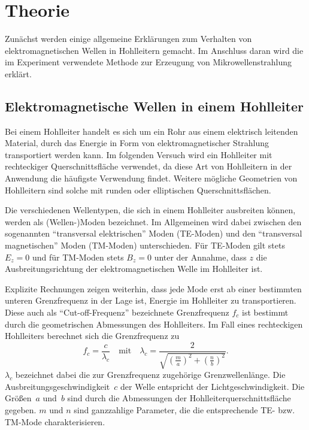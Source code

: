 \section{Theorie}
\label{sec:theorie}

Zunächst werden einige allgemeine Erklärungen zum Verhalten von elektromagnetischen Wellen in Hohlleitern gemacht.
Im Anschluss daran wird die im Experiment verwendete Methode zur Erzeugung von Mikrowellenstrahlung erklärt.

\subsection{Elektromagnetische Wellen in einem Hohlleiter}

Bei einem Hohlleiter handelt es sich um ein Rohr aus einem elektrisch leitenden Material, durch das Energie in Form von elektromagnetischer Strahlung transportiert werden kann.
Im folgenden Versuch wird ein Hohlleiter mit rechteckiger Querschnittsfläche verwendet, da diese Art von Hohlleitern in der Anwendung die häufigste Verwendung findet.
Weitere mögliche Geometrien von Hohlleitern sind solche mit runden oder elliptischen Querschnittsflächen.

Die verschiedenen Wellentypen, die sich in einem Hohlleiter ausbreiten können, werden als (Wellen-)Moden bezeichnet.
Im Allgemeinen wird dabei zwischen den sogenannten \enquote{transversal elektrischen} Moden (TE-Moden) und den \enquote{transversal magnetischen} Moden (TM-Moden) unterschieden.
Für TE-Moden gilt stets $E_z=0$ und für TM-Moden stets $B_z=0$ unter der Annahme, dass $z$ die Ausbreitungsrichtung der elektromagnetischen Welle im Hohlleiter ist.

Explizite Rechnungen zeigen weiterhin, dass jede Mode erst ab einer bestimmten unteren Grenzfrequenz in der Lage ist, Energie im Hohlleiter zu transportieren.
Diese auch als \enquote{Cut-off-Frequenz} bezeichnete Grenzfrequenz $f_c$ ist bestimmt durch die geometrischen Abmessungen des Hohlleiters.
Im Fall eines rechteckigen Hohlleiters berechnet sich die Grenzfrequenz zu
%
\begin{equation}
	f_c=\frac{c}{\lambda_c}\quad\text{mit}\quad\lambda_c=\frac{2}{\sqrt{\left(\frac{m}{a}\right)^2+\left(\frac{n}{b}\right)^2}}.
	\label{eq:cutoff}
\end{equation}
%
$\lambda_c$ bezeichnet dabei die zur Grenzfrequenz zugehörige Grenzwellenlänge.
Die Ausbreitungsgeschwindigkeit~$c$ der Welle entspricht der Lichtgeschwindigkeit.
Die Größen~$a$ und~$b$ sind durch die Abmessungen der Hohlleiterquerschnittsfläche gegeben.
$m$ und $n$ sind ganzzahlige Parameter, die die entsprechende TE- bzw. TM-Mode charakterisieren.

